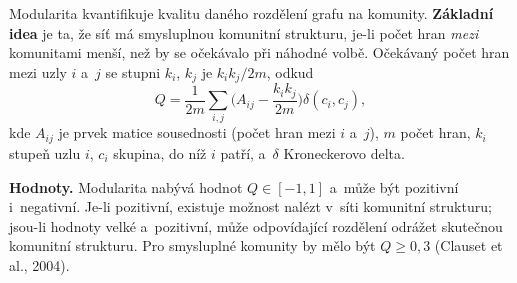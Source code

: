 \documentclass[11pt,a4paper]{article}
\theoremstyle{definition}
\begin{document}
\begin{defbox}[Modularita $Q$]
Modularita kvantifikuje kvalitu daného rozdělení grafu na komunity. \textbf{Základní idea} je
ta, že síť má smysluplnou komunitní strukturu, je-li počet hran \emph{mezi} komunitami menší,
než by se očekávalo při náhodné volbě. Očekávaný počet hran mezi uzly $i$ a~$j$ se stupni $k_i$,
$k_j$ je $k_ik_j/2m$, odkud
\[ Q=\frac{1}{2m}\sum_{i,j}\Big(A_{ij}-\frac{k_ik_j}{2m}\Big)\delta(c_i,c_j), \]
kde $A_{ij}$ je prvek matice sousednosti (počet hran mezi $i$ a~$j$), $m$ počet hran, $k_i$
stupeň uzlu $i$, $c_i$ skupina, do níž $i$ patří, a~$\delta$ Kroneckerovo delta.

\textbf{Hodnoty.} Modularita nabývá hodnot $Q\in[-1,1]$ a~může být pozitivní i~negativní.
Je-li pozitivní, existuje možnost nalézt v~síti komunitní strukturu; jsou-li hodnoty velké
a~pozitivní, může odpovídající rozdělení odrážet skutečnou komunitní strukturu. Pro smysluplné
komunity by mělo být $Q\ge 0{,}3$ (Clauset et al., 2004).
\end{defbox}
\end{document}
